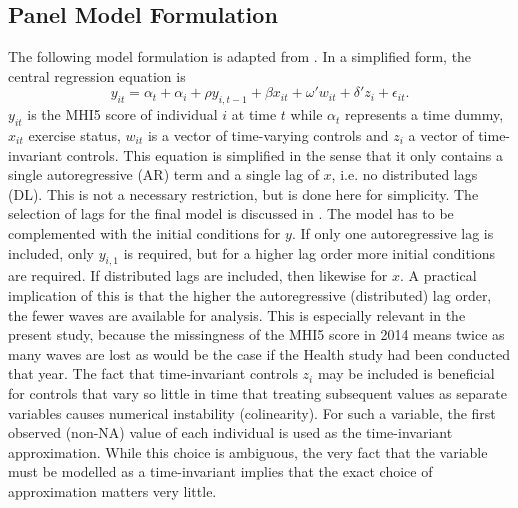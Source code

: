 \subsection{Panel Model Formulation}
\label{sec:methods:model_formulation}
The following model formulation is adapted from .
In a simplified form, the central regression equation is
\begin{equation}
    \label{eq:methods:model_formulation}
    y_{it} = \alpha_t + \alpha_i + \rho y_{i,t-1} + \beta x_{it} + \omega' w_{it} + \delta' z_i + \epsilon_{it}.
\end{equation}
$y_{it}$ is the MHI5 score of individual $i$ at time $t$ while $\alpha_t$ represents a time dummy,
$x_{it}$ exercise status, $w_{it}$ is a vector of time-varying controls and $z_i$ a vector of time-invariant controls.
This equation is simplified in the sense that it only contains a single autoregressive (AR) term and a single lag of $x$,
i.e. no distributed lags (DL). This is not a necessary restriction, but is done here for simplicity.
The selection of lags for the final model is discussed in . The model has to be complemented
with the initial conditions for $y$. If only one autoregressive lag is included, only $y_{i,1}$ is required,
but for a higher lag order more initial conditions are required. If distributed lags are included, then likewise for $x$.
A practical implication of this is that the higher the autoregressive (distributed) lag order, the fewer waves
are available for analysis. This is especially relevant in the present study, because the missingness of the MHI5 score
in 2014 means twice as many waves are lost as would be the case if the Health study had been conducted that year.
The fact that time-invariant controls $z_i$ may be included is beneficial for controls that vary so little in time that
treating subsequent values as separate variables causes numerical instability (colinearity). For such a variable,
the first observed (non-NA) value of each individual is used as the time-invariant approximation. While this choice
is ambiguous, the very fact that the variable must be modelled as a time-invariant implies that the exact
choice of approximation matters very little.

